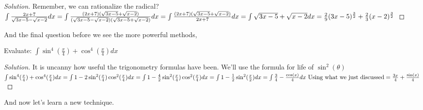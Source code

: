 \begin{proof}
    [Solution]
    Remember, we can rationalize the radical?\\
    $
    \int \frac{2x+7}{\sqrt{3x-5}-\sqrt{x-2}}dx
    = \int \frac{(2x+7)(\sqrt{3x-5}+\sqrt{x-2})}{(\sqrt{3x-5}-\sqrt{x-2})(\sqrt{3x-5}+\sqrt{x-2})}dx
    = \int \frac{(2x+7)(\sqrt{3x-5}+\sqrt{x-2})}{2x+7} dx\\
    =\int \sqrt{3x-5}+\sqrt{x-2} dx
    = \frac{2}{9}(3x-5)^{\frac{3}{2}}+\frac{2}{3}(x-2)^{\frac{3}{2}}
    $
\end{proof}
And the final question before we see the more powerful methods,\\
\begin{example}
    Evaluate:
    $
    \int \sin^4(\frac{x}{4})+\cos^4(\frac{x}{4}) dx
    $
\end{example}
\begin{proof}
    [Solution]
    It is uncanny how useful the trigonometry formulas have been. We'll use the formula for life of $\sin^2(\theta)$\\
    $
    \int \sin^4(\frac{x}{4})+\cos^4(\frac{x}{4}) dx\\
    = \int 1 - 2\sin^2(\frac{x}{4})\cos^2(\frac{x}{4})dx\\
    = \int 1 - \frac{4}{2}\sin^2(\frac{x}{4})\cos^2(\frac{x}{4})dx\\
    = \int 1 - \frac{1}{2}\sin^2(\frac{x}{2})dx\\
    = \int \frac{3}{4} - \frac{\cos(x)}{4}dx \text{ Using what we just discussed} \\
    = \frac{3x}{4} + \frac{\sin(x)}{4}
    $
\end{proof}
And now let's learn a new technique.\\
